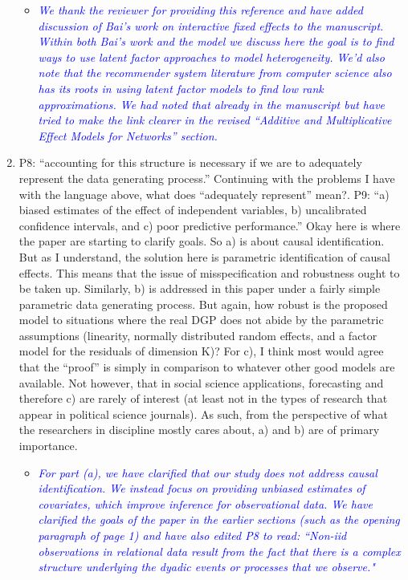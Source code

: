 \begin{enumerate}
	\begin{itemize}
		\item \textcolor{blue}{ \emph{
		We thank the reviewer for providing this reference and have added discussion of Bai's work on interactive fixed effects to the manuscript. Within both Bai's work and the model we discuss here the goal is to find ways to use latent factor approaches to model heterogeneity. We'd also note that the recommender system literature from computer science also has its roots in using latent factor models to find low rank approximations. We had noted that already in the manuscript but have tried to make the link clearer in the revised ``Additive and Multiplicative Effect Models for Networks'' section.
		}}
	\end{itemize}
	\item P8: “accounting for this structure is necessary if we are to adequately represent the data generating process.” Continuing with the problems I have with the language above, what does “adequately represent” mean?. P9: “a) biased estimates of the effect of independent variables, b) uncalibrated confidence intervals, and c) poor predictive performance.” Okay here is where the paper are starting to clarify goals.  So a) is about causal identification.  But as I understand, the solution here is parametric identification of causal effects.  This means that the issue of misspecification and robustness ought to be taken up.  Similarly, b) is addressed in this paper under a fairly simple parametric data generating process. But again, how robust is the proposed model to situations where the real DGP does not abide by the parametric assumptions (linearity, normally distributed random effects, and a factor model for the residuals of dimension K)? For c), I think most would agree that the “proof” is simply in comparison to whatever other good models are available.  Not however, that in social science applications, forecasting and therefore c) are rarely of interest (at least not in the types of research that appear in political science journals).  As such, from the perspective of what the researchers in discipline mostly cares about, a) and b) are of primary importance.
	\begin{itemize}
		\item \textcolor{blue}{ \emph{
			For part (a), we have clarified that our study does not address causal identification. We instead focus on providing unbiased estimates of covariates, which improve inference for observational data. We have clarified the goals of the paper in the earlier sections (such as the opening paragraph of page 1) and have also edited P8 to read: ``Non-iid observations in relational data result from the fact that there is a complex structure underlying the dyadic events or processes that we observe." }}

\end{itemize}
\end{enumerate}

